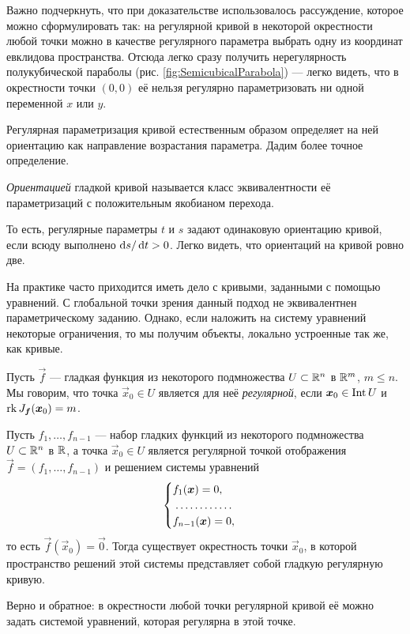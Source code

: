 Важно подчеркнуть, что при доказательстве использовалось рассуждение, которое можно сформулировать так: на регулярной кривой в некоторой окрестности любой точки можно в качестве регулярного параметра выбрать одну из координат евклидова пространства. Отсюда легко сразу получить нерегулярность полукубической параболы (рис. \ref{fig:SemicubicalParabola}) --- легко видеть, что в окрестности точки $(0, 0)$ её нельзя регулярно параметризовать ни одной переменной $x$ или $y$.

Регулярная параметризация кривой естественным образом определяет на ней ориентацию как направление возрастания параметра. Дадим более точное определение.

\begin{definition}
	\textit{Ориентацией} гладкой кривой называется класс эквивалентности её параметризаций с положительным якобианом перехода.
\end{definition}

То есть, регулярные параметры $t$ и $s$ задают одинаковую ориентацию кривой, если всюду выполнено $\mathop{}\!\mathrm{d} s / \mathop{}\!\mathrm{d} t > 0$. Легко видеть, что ориентаций на кривой ровно две.

На практике часто приходится иметь дело с кривыми, заданными с помощью уравнений. С глобальной точки зрения данный подход не эквивалентнен параметрическому заданию. Однако, если наложить на систему уравнений некоторые ограничения, то мы получим объекты, локально устроенные так же, как кривые.

\begin{definition}
	Пусть $\vec{f}$ --- гладкая функция из некоторого подмножества $U \subset \mathbb{R}^n$ в $\mathbb{R}^m$, $m \leqslant n$. Мы говорим, что точка $\vec{x}_0 \in U$ является для неё \textit{регулярной}, если $\boldsymbol{x}_0 \in \operatorname{Int} U$ и $\operatorname{rk} J_{\boldsymbol{f}}(\boldsymbol{x}_0) = m$.
\end{definition}

\begin{theorem} \label{theorem:SurfacesToCurve}
	Пусть $f_1, \ldots, f_{n - 1}$ --- набор гладких функций из некоторого подмножества $U \subset \mathbb{R}^n$ в $\mathbb{R}$, а точка $\vec{x}_0 \in U$ является регулярной точкой отображения $\vec{f} = (f_1, \ldots, f_{n - 1})$ и решением системы уравнений
	\[
		\begin{cases}
			f_1(\vec{x}) = 0,\\
			\dotfill\\
			f_{n - 1}(\vec{x}) = 0,
		\end{cases}
	\]
	то есть $\vec{f}(\vec{x}_0) = \vec{0}$. Тогда существует окрестность точки $\vec{x}_0$, в которой пространство решений этой системы представляет собой гладкую регулярную кривую.
	
	Верно и обратное: в окрестности любой точки регулярной кривой её можно задать системой уравнений, которая регулярна в этой точке.
\end{theorem}

